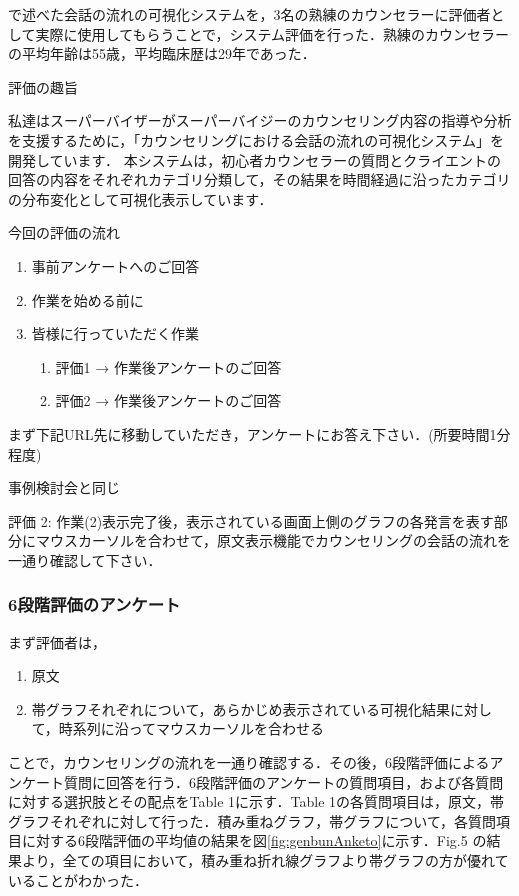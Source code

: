 \documentclass[shuuron]{kuee}
\begin{document}
で述べた会話の流れの可視化システムを，3名の熟練のカウンセラーに評価者として実際に使用してもらうことで，システム評価を行った．熟練のカウンセラーの平均年齢は55歳，平均臨床歴は29年であった．

評価の趣旨

私達はスーパーバイザーがスーパーバイジーのカウンセリング内容の指導や分析を支援するために，「カウンセリングにおける会話の流れの可視化システム」を開発しています．
本システムは，初心者カウンセラーの質問とクライエントの回答の内容をそれぞれカテゴリ分類して，その結果を時間経過に沿ったカテゴリの分布変化として可視化表示しています．

今回の評価の流れ







\begin{enumerate}

 \item 事前アンケートへのご回答
  \item 作業を始める前に
   \item 皆様に行っていただく作業
   \begin{enumerate}
   \item 評価1 → 作業後アンケートのご回答
    \item 評価2 → 作業後アンケートのご回答
    \end{enumerate}
\end{enumerate}


まず下記URL先に移動していただき，アンケートにお答え下さい．(所要時間1分程度)


事例検討会と同じ

評価 2: 作業(2)表示完了後，表示されている画面上側のグラフの各発言を表す部分にマウスカーソルを合わせて，原文表示機能でカウンセリングの会話の流れを一通り確認して下さい．

\subsubsection{6段階評価のアンケート}

まず評価者は，
\begin{enumerate}

 \item 原文
  \item 帯グラフそれぞれについて，あらかじめ表示されている可視化結果に対して，時系列に沿ってマウスカーソルを合わせる
\end{enumerate}


ことで，カウンセリングの流れを一通り確認する．その後，6段階評価によるアンケート質問に回答を行う．6段階評価のアンケートの質問項目，および各質問に対する選択肢とその配点をTable 1に示す．Table 1の各質問項目は，原文，帯グラフそれぞれに対して行った．積み重ねグラフ，帯グラフについて，各質問項目に対する6段階評価の平均値の結果を図\ref{fig:genbunAnketo}に示す．Fig.5 の結果より，全ての項目において，積み重ね折れ線グラフより帯グラフの方が優れていることがわかった．
\end{document}
